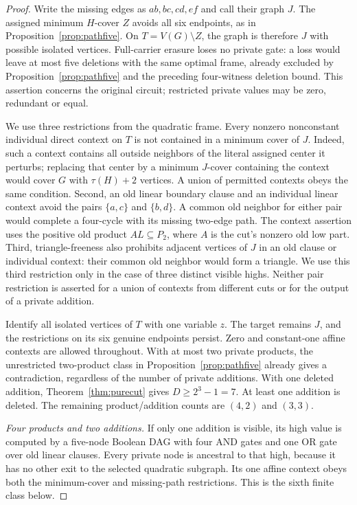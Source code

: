\begin{proof}
Write the missing edges as $ab,bc,cd,ef$ and call their graph $J$.
The assigned minimum $H$-cover $Z$ avoids all six endpoints, as in
Proposition~\ref{prop:pathfive}. On $T=V(G)\setminus Z$, the graph is
therefore $J$ with possible isolated vertices. Full-carrier erasure loses
no private gate: a loss would leave at most five deletions with the same
optimal frame, already excluded by Proposition~\ref{prop:pathfive} and
the preceding four-witness deletion bound. This assertion concerns the
original circuit; restricted private values may be zero, redundant or
equal.

We use three restrictions from the quadratic frame. Every nonzero
nonconstant individual direct context on $T$ is not contained in a
minimum cover of $J$. Indeed, such a context contains all outside
neighbors of the literal assigned center it perturbs; replacing that
center by a minimum $J$-cover containing the context would cover $G$
with $\tau(H)+2$ vertices. A union of permitted contexts obeys the same
condition. Second, an old linear boundary clause and an individual
linear context avoid the pairs $\{a,c\}$ and $\{b,d\}$. A common old
neighbor for either pair would complete a four-cycle with its missing
two-edge path. The context assertion uses the positive old product
$AL\subseteq P_2$, where $A$ is the cut's nonzero old low part.
Third, triangle-freeness also prohibits adjacent vertices of $J$ in an
old clause or individual context: their common old neighbor would form
a triangle. We use this third restriction only in the case of three
distinct visible highs. Neither pair restriction is asserted for a
union of contexts from different cuts or for the output of a private
addition.

Identify all isolated vertices of $T$ with one variable $z$. The target
remains $J$, and the restrictions on its six genuine endpoints persist.
Zero and constant-one affine contexts are allowed throughout. With at
most two private products, the unrestricted two-product class in
Proposition~\ref{prop:pathfive} already gives a contradiction, regardless
of the number of private additions. With one deleted addition,
Theorem~\ref{thm:purecut} gives $D\ge 2^3-1=7$. At least one addition is
deleted. The remaining product/addition counts are $(4,2)$ and $(3,3)$.

\emph{Four products and two additions.}
If only one addition is visible, its high value is computed by a
five-node Boolean DAG with four AND gates and one OR gate over old
linear clauses. Every private node is ancestral to that high, because
it has no other exit to the selected quadratic subgraph. Its one
affine context obeys both the minimum-cover and missing-path
restrictions. This is the sixth finite class below.


\end{proof}
